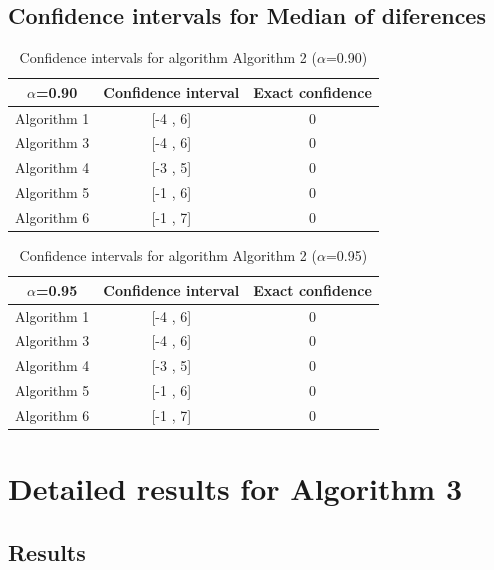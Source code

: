 \documentclass[a4paper,10pt]{article}
\begin{document}
\subsection{Confidence intervals for Median of diferences}

\begin{table}[!htp]
\centering\small
\begin{tabular}{
|c|c|c|}
\hline
 $\alpha$=0.90 & Confidence interval & Exact confidence \\ \hline 
Algorithm 1 & [-4 , 6] & 0\\ \hline 
Algorithm 3 & [-4 , 6] & 0\\ \hline 
Algorithm 4 & [-3 , 5] & 0\\ \hline 
Algorithm 5 & [-1 , 6] & 0\\ \hline 
Algorithm 6 & [-1 , 7] & 0\\ \hline 

\end{tabular}
\caption{Confidence intervals for algorithm Algorithm 2 ($\alpha$=0.90)}
\end{table}
\begin{table}[!htp]
\centering\small
\begin{tabular}{
|c|c|c|}
\hline
 $\alpha$=0.95 & Confidence interval & Exact confidence \\ \hline 
Algorithm 1 & [-4 , 6] & 0\\ \hline 
Algorithm 3 & [-4 , 6] & 0\\ \hline 
Algorithm 4 & [-3 , 5] & 0\\ \hline 
Algorithm 5 & [-1 , 6] & 0\\ \hline 
Algorithm 6 & [-1 , 7] & 0\\ \hline 

\end{tabular}
\caption{Confidence intervals for algorithm Algorithm 2 ($\alpha$=0.95)}
\end{table}

 \clearpage 


\section{Detailed results for Algorithm 3}


\subsection{Results}
\end{document}
